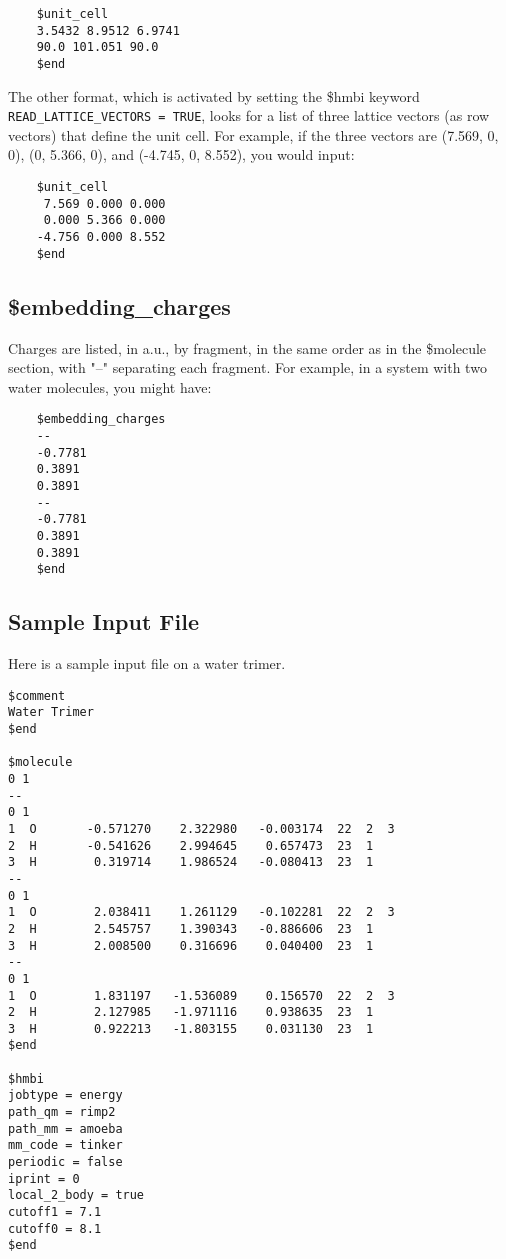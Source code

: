 \documentclass[11pt,letterpaper]{article}
\begin{document}
\begin{spacing}{1.0}
\begin{verbatim}
	$unit_cell
	3.5432 8.9512 6.9741
	90.0 101.051 90.0
	$end
\end{verbatim}
	The other format, which is activated by setting the \$hmbi
        keyword {\tt READ\_LATTICE\_VECTORS = TRUE}, looks for a list
        of three lattice vectors (as row vectors) that define the unit
        cell.  For example, if the three vectors are (7.569, 0, 0),
        (0, 5.366, 0), and (-4.745, 0, 8.552), you would input:

\begin{verbatim}
	$unit_cell
	 7.569 0.000 0.000
	 0.000 5.366 0.000
	-4.756 0.000 8.552
	$end
\end{verbatim}


\subsection{\$embedding\_charges}
	Charges are listed, in a.u., by fragment, in the same order as
        in the \$molecule section, with "--" separating each fragment.
        For example, in a system with two water molecules, you might
        have:

\begin{verbatim}
	$embedding_charges
	--
	-0.7781
	0.3891
	0.3891
	--
	-0.7781
	0.3891
	0.3891
	$end
\end{verbatim}



\subsection{Sample Input File}
Here is a sample input file on a water trimer.

\begin{verbatim}
$comment
Water Trimer
$end

$molecule
0 1
--
0 1
1  O       -0.571270    2.322980   -0.003174  22  2  3
2  H       -0.541626    2.994645    0.657473  23  1
3  H        0.319714    1.986524   -0.080413  23  1
--
0 1
1  O        2.038411    1.261129   -0.102281  22  2  3
2  H        2.545757    1.390343   -0.886606  23  1
3  H        2.008500    0.316696    0.040400  23  1
--
0 1
1  O        1.831197   -1.536089    0.156570  22  2  3
2  H        2.127985   -1.971116    0.938635  23  1
3  H        0.922213   -1.803155    0.031130  23  1
$end

$hmbi
jobtype = energy
path_qm = rimp2 
path_mm = amoeba
mm_code = tinker
periodic = false
iprint = 0
local_2_body = true
cutoff1 = 7.1
cutoff0 = 8.1
$end


\end{verbatim}
\end{spacing}
\end{document}
